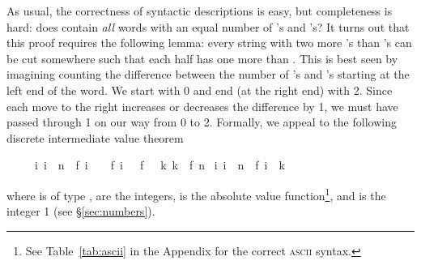 \begin{isabellebody}
\begin{isamarkuptext}
As usual, the correctness of syntactic descriptions is easy, but completeness
is hard: does  contain \emph{all} words with an equal number of
's and 's? It turns out that this proof requires the
following lemma: every string with two more 's than 's can be cut somewhere such that each half has one more  than
. This is best seen by imagining counting the difference between the
number of 's and 's starting at the left end of the
word. We start with 0 and end (at the right end) with 2. Since each move to the
right increases or decreases the difference by 1, we must have passed through
1 on our way from 0 to 2. Formally, we appeal to the following discrete
intermediate value theorem 
\begin{isabelle}%
\ \ \ \ \ {\isasymlbrakk}{\isasymforall}i{\isachardot}\ i\ {\isacharless}\ n\ {\isasymlongrightarrow}\ {\isasymbar}f\ {\isacharparenleft}i\ {\isacharplus}\ {}{\isacharparenright}\ {\isacharminus}\ f\ i{\isasymbar}\ {\isasymle}\ {\isacharhash}{}{\isacharsemicolon}\ f\ {}\ {\isasymle}\ k{\isacharsemicolon}\ k\ {\isasymle}\ f\ n{\isasymrbrakk}\isanewline
\isaindent{\ \ \ \ \ }{\isasymLongrightarrow}\ {\isasymexists}i{\isachardot}\ i\ {\isasymle}\ n\ {\isasymand}\ f\ i\ {\isacharequal}\ k%
\end{isabelle}
where  is of type ,  are the integers,
\isa{{\isasymbar}{\isachardot}{\isasymbar}} is the absolute value function\footnote{See
Table~\ref{tab:ascii} in the Appendix for the correct \textsc{ascii}
syntax.}, and  is the integer 1 (see \S\ref{sec:numbers}).


\end{isamarkuptext}
\end{isabellebody}
